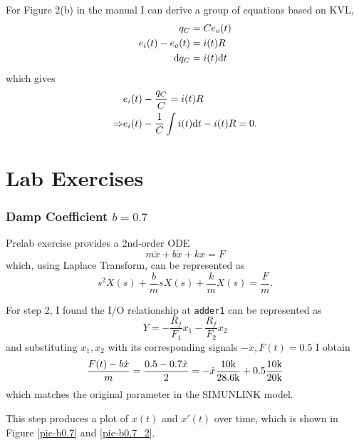 \pagebreak
{}

For Figure 2(b) in the manual I can derive a group of equations based on KVL,
\begin{align}
   q_C &= Ce_o(t) \\
  e_i(t) - e_o(t) &= i(t)R \\
  \text{d} q_C &= i(t)\text{d} t
\end{align}
which gives
\begin{align*}
  &e_i(t) - \frac{q_C}{C} = i(t) R \\
\Rightarrow   &e_i(t) - \frac{1}{C}\int i(t)\text{d} t- i(t)R = 0.
\end{align*}


\pagebreak\section{Lab Exercises}

\subsubsection*{Damp Coefficient $b=0.7$}

Prelab exercise provides a 2nd-order ODE
\[ m\ddot{x} + b\dot{x} + kx = F \]
which, using Laplace Transform, can be represented as 
\[ s^2 X(s) + \frac{b}{m}sX(s) + \frac{k}{m}X(s) = \frac{F}{m}. \]

For step 2, I found the I/O relationship at \texttt{adder1} can be represented
as 
\[ Y = -\frac{R_f}{F_1}x_1 - \frac{R_f}{F_2}x_2\]
and substituting $x_1, x_2$ with its corresponding signals $-\dot{x}, F(t)=0.5$
I obtain
\[ \frac{F(t)-b\dot{x}}{m}=\frac{0.5-0.7\dot{x}}{2}=-\dot{x}\frac{10\text{k}}{28.6\text{k}}
+0.5\frac{10\text{k}}{20\text{k}} \]
which matches the original parameter in the SIMUNLINK model.

This step produces a plot of $x(t)$ and $x'(t)$ over time, which is shown in
Figure \ref{pic-b0.7} and \ref{pic-b0.7_2}.


